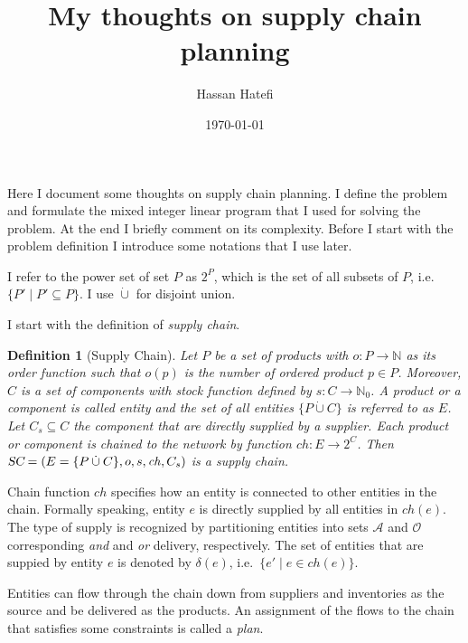 \documentclass[a4paper]{article}
\newcommand{\nat}{\mathbb{N}}
\newtheorem{definition}{Definition}
\newcommand{\pow}[1]{2^{#1}}
\newcommand{\dotcup}{\mathbin{\dot{\cup}}}
\newcommand{\ands}{\mathcal{A}}
\newcommand{\ors}{\mathcal{O}}
\newcommand{\SC}{\textsl{SC}}
\newcommand{\chain}{\mathit{ch}}
\begin{document}
\author{Hassan Hatefi}
\title{My thoughts on supply chain planning}
\date{\today}
\maketitle

Here I document some thoughts on supply chain planning. I define the problem
and formulate the mixed integer linear program that I used for solving the
problem. At the end I briefly comment on its complexity. Before I start with
the problem definition I introduce some notations that I use later.

I refer to the power set of set $P$ as $\pow{P}$, which is the set of all
subsets of $P$, i.e. $\{P'\mid P'\subseteq P\}$. I use $\dot{\cup}$ for
disjoint union.

I start with the definition of \emph{supply chain}.
\begin{definition}[Supply Chain]\label{def:sc}
  Let $P$ be a set of \emph{products} with $o:P\to\nat$ as its order
  function such that $o(p)$ is the number of ordered product $p\in
  P$. Moreover, $C$ is a set of \emph{components} with stock function
  defined by $s:C\to\nat_0$. A product or a component is called
  \emph{entity} and the set of all entities $\{P\dotcup C\}$ is
  referred to as $E$. Let $C_s\subseteq C$ the component that are
  directly supplied by a supplier. Each product or component is
  chained to the network by function $\chain:E\to\pow{C}$. Then
  $\SC=(E=\{P\dotcup C\},o,s,\chain,C_s)$ is a supply chain.
\end{definition}
Chain function $\chain$ specifies how an entity is connected to other entities
in the chain. Formally speaking, entity $e$ is directly supplied by all
entities in $\chain(e)$. The type of supply is recognized by partitioning
entities into sets $\ands$ and $\ors$ corresponding \emph{and} and \emph{or}
delivery, respectively. The set of entities that are suppied by entity $e$ is
denoted by $\delta(e)$, i.e.~$\{e'\mid e\in\chain(e)\}$.

Entities can flow through the chain down from suppliers and inventories as the
source and be delivered as the products. An assignment of the flows to the
chain that satisfies some constraints is called a \emph{plan}.
\end{document}
